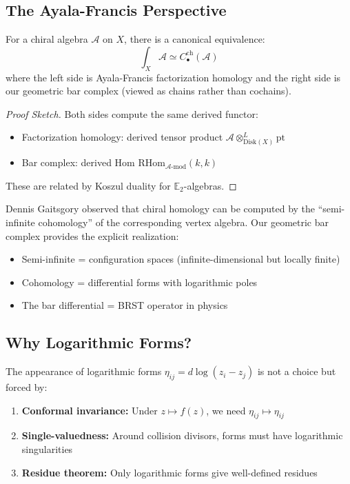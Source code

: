 \subsection{The Ayala-Francis Perspective}

\begin{theorem}[Factorization Homology = Bar Complex]\label{thm:fact-homology}
For a chiral algebra $\mathcal{A}$ on $X$, there is a canonical equivalence:
$$\int_X \mathcal{A} \simeq C_{\bullet}^{\text{ch}}(\mathcal{A})$$
where the left side is Ayala-Francis factorization homology and the right side is our geometric bar complex 
(viewed as chains rather than cochains).
\end{theorem}

\begin{proof}[Proof Sketch]
Both sides compute the same derived functor:
\begin{itemize}
\item Factorization homology: derived tensor product $\mathcal{A} \otimes^L_{\text{Disk}(X)} \text{pt}$
\item Bar complex: derived Hom $\text{RHom}_{\mathcal{A}\text{-mod}}(k, k)$
\end{itemize}
These are related by Koszul duality for $\mathbb{E}_2$-algebras.
\end{proof}

\begin{remark}
Dennis Gaitsgory observed that chiral homology can be computed by the ``semi-infinite cohomology'' 
of the corresponding vertex algebra. Our geometric bar complex provides the explicit realization:
\begin{itemize}
\item Semi-infinite = configuration spaces (infinite-dimensional but locally finite)
\item Cohomology = differential forms with logarithmic poles
\item The bar differential = BRST operator in physics
\end{itemize}
\end{remark}

\subsection{Why Logarithmic Forms?}

\begin{proposition}
The appearance of logarithmic forms $\eta_{ij} = d\log(z_i - z_j)$ is not a choice but forced by:
\begin{enumerate}
\item \textbf{Conformal invariance:} Under $z \mapsto f(z)$, we need $\eta_{ij} \mapsto \eta_{ij}$
\item \textbf{Single-valuedness:} Around collision divisors, forms must have logarithmic singularities
\item \textbf{Residue theorem:} Only logarithmic forms give well-defined residues
\end{enumerate}
\end{proposition}

